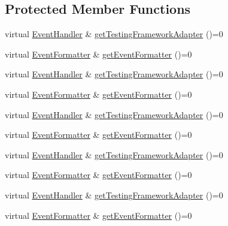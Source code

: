 \subsection*{Protected Member Functions}
\begin{DoxyCompactItemize}
\item 
virtual \mbox{\hyperlink{structfakeit_1_1EventHandler}{Event\+Handler}} \& \mbox{\hyperlink{structfakeit_1_1FakeitContext_a4be017ccd6c80cdafc02bd1985f183c8}{get\+Testing\+Framework\+Adapter}} ()=0
\item 
virtual \mbox{\hyperlink{structfakeit_1_1EventFormatter}{Event\+Formatter}} \& \mbox{\hyperlink{structfakeit_1_1FakeitContext_a066d191292b1002025b02f6569f48b9b}{get\+Event\+Formatter}} ()=0
\item 
virtual \mbox{\hyperlink{structfakeit_1_1EventHandler}{Event\+Handler}} \& \mbox{\hyperlink{structfakeit_1_1FakeitContext_a4be017ccd6c80cdafc02bd1985f183c8}{get\+Testing\+Framework\+Adapter}} ()=0
\item 
virtual \mbox{\hyperlink{structfakeit_1_1EventFormatter}{Event\+Formatter}} \& \mbox{\hyperlink{structfakeit_1_1FakeitContext_a066d191292b1002025b02f6569f48b9b}{get\+Event\+Formatter}} ()=0
\item 
virtual \mbox{\hyperlink{structfakeit_1_1EventHandler}{Event\+Handler}} \& \mbox{\hyperlink{structfakeit_1_1FakeitContext_a4be017ccd6c80cdafc02bd1985f183c8}{get\+Testing\+Framework\+Adapter}} ()=0
\item 
virtual \mbox{\hyperlink{structfakeit_1_1EventFormatter}{Event\+Formatter}} \& \mbox{\hyperlink{structfakeit_1_1FakeitContext_a066d191292b1002025b02f6569f48b9b}{get\+Event\+Formatter}} ()=0
\item 
virtual \mbox{\hyperlink{structfakeit_1_1EventHandler}{Event\+Handler}} \& \mbox{\hyperlink{structfakeit_1_1FakeitContext_a4be017ccd6c80cdafc02bd1985f183c8}{get\+Testing\+Framework\+Adapter}} ()=0
\item 
virtual \mbox{\hyperlink{structfakeit_1_1EventFormatter}{Event\+Formatter}} \& \mbox{\hyperlink{structfakeit_1_1FakeitContext_a066d191292b1002025b02f6569f48b9b}{get\+Event\+Formatter}} ()=0
\item 
virtual \mbox{\hyperlink{structfakeit_1_1EventHandler}{Event\+Handler}} \& \mbox{\hyperlink{structfakeit_1_1FakeitContext_a4be017ccd6c80cdafc02bd1985f183c8}{get\+Testing\+Framework\+Adapter}} ()=0
\item 
virtual \mbox{\hyperlink{structfakeit_1_1EventFormatter}{Event\+Formatter}} \& \mbox{\hyperlink{structfakeit_1_1FakeitContext_a066d191292b1002025b02f6569f48b9b}{get\+Event\+Formatter}} ()=0

\end{DoxyCompactItemize}
